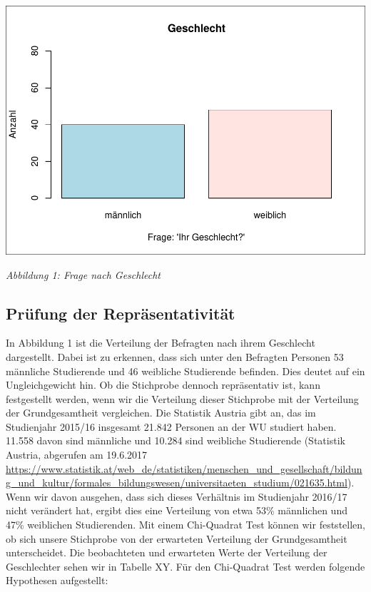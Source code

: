 \documentclass[]{article}
\begin{document}
\includegraphics{bericht_files/figure-latex/barplot Geschlecht-1.pdf}

\begin{center}
\textit{Abbildung 1: Frage nach Geschlecht}
\bigskip
\end{center}

\subsection{Prüfung der
Repräsentativität}\label{prufung-der-reprasentativitat}

In Abbildung 1 ist die Verteilung der Befragten nach ihrem Geschlecht
dargestellt. Dabei ist zu erkennen, dass sich unter den Befragten
Personen 53 männliche Studierende und 46 weibliche Studierende befinden.
Dies deutet auf ein Ungleichgewicht hin. Ob die Stichprobe dennoch
repräsentativ ist, kann festgestellt werden, wenn wir die Verteilung
dieser Stichprobe mit der Verteilung der Grundgesamtheit vergleichen.
Die Statistik Austria gibt an, das im Studienjahr 2015/16 insgesamt
21.842 Personen an der WU studiert haben. 11.558 davon sind männliche
und 10.284 sind weibliche Studierende (Statistik Austria, abgerufen am
19.6.2017
\url{https://www.statistik.at/web_de/statistiken/menschen_und_gesellschaft/bildung_und_kultur/formales_bildungswesen/universitaeten_studium/021635.html}).
Wenn wir davon ausgehen, dass sich dieses Verhältnis im Studienjahr
2016/17 nicht verändert hat, ergibt dies eine Verteilung von etwa 53\%
männlichen und 47\% weiblichen Studierenden. Mit einem Chi-Quadrat Test
können wir feststellen, ob sich unsere Stichprobe von der erwarteten
Verteilung der Grundgesamtheit unterscheidet. Die beobachteten und
erwarteten Werte der Verteilung der Geschlechter sehen wir in Tabelle
XY. Für den Chi-Quadrat Test werden folgende Hypothesen aufgestellt:
\end{document}
